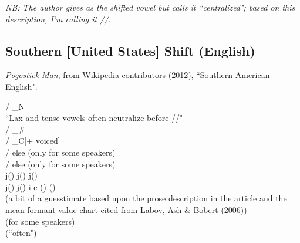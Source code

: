 \documentclass[11pt]{article}
\newcommand{\ipa}{\textipa}
\newcommand{\tab}{\hspace{25pt}}
\begin{document}
\tab \textit{NB: The author gives \textipa{\u{\i}} as the shifted vowel but calls it \textquotedblleft centralized"; based on this description, I'm calling it //.}

\textipa{\ae}  \textrightarrow\hspace{0pt} 

\subsection{Southern [United States] Shift (English)}\textit{Pogostick Man}, from Wikipedia contributors (2012), ``Southern American English".

 \textrightarrow\hspace{0pt}  / _N \\
``Lax and tense vowels often neutralize before /\ipa{l}/" \\
 \textrightarrow\hspace{0pt}  / _\# \\
 \textrightarrow\hspace{0pt}  / _C[+ voiced] \\
 \textrightarrow\hspace{0pt}  / else (only for some speakers) \\
 \textrightarrow\hspace{0pt}  / else (only for some speakers) \\
\textipa{\ae}  \textrightarrow\hspace{0pt} \textipa{\ae}j() j() j() \\
j() j() i e \textrightarrow\hspace{0pt} \ipa{ej}() \ipa{ij}()   \\
 \textrightarrow\hspace{0pt}  (a bit of a guesstimate based upon the prose description in the article and the mean-formant-value chart cited from Labov, Ash \&\hspace{0pt} Bobert (2006))\\
 \textrightarrow\hspace{0pt}  (for some speakers) \\
 \textrightarrow\hspace{0pt}  (``often") \\
\end{document}

